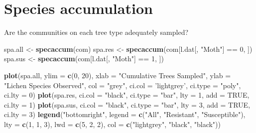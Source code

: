 \documentclass[]{article}
\newenvironment{Shaded}{\begin{snugshade}}{\end{snugshade}}
\newcommand{\KeywordTok}[1]{\textcolor[rgb]{0.13,0.29,0.53}{\textbf{{#1}}}}
\newcommand{\DataTypeTok}[1]{\textcolor[rgb]{0.13,0.29,0.53}{{#1}}}
\newcommand{\DecValTok}[1]{\textcolor[rgb]{0.00,0.00,0.81}{{#1}}}
\newcommand{\StringTok}[1]{\textcolor[rgb]{0.31,0.60,0.02}{{#1}}}
\newcommand{\OtherTok}[1]{\textcolor[rgb]{0.56,0.35,0.01}{{#1}}}
\newcommand{\NormalTok}[1]{{#1}}
\begin{document}
\section{Species accumulation}\label{species-accumulation}

Are the communities on each tree type adequately sampled?

\begin{Shaded}
\begin{Highlighting}[]
\NormalTok{spa.all <-}\StringTok{ }\KeywordTok{specaccum}\NormalTok{(com)}
\NormalTok{spa.res <-}\StringTok{ }\KeywordTok{specaccum}\NormalTok{(com[l.dat[, }\StringTok{"Moth"}\NormalTok{] ==}\StringTok{ }\DecValTok{0}\NormalTok{, ])}
\NormalTok{spa.sus <-}\StringTok{ }\KeywordTok{specaccum}\NormalTok{(com[l.dat[, }\StringTok{"Moth"}\NormalTok{] ==}\StringTok{ }\DecValTok{1}\NormalTok{, ])}

\KeywordTok{plot}\NormalTok{(spa.all,}
     \DataTypeTok{ylim =} \KeywordTok{c}\NormalTok{(}\DecValTok{0}\NormalTok{, }\DecValTok{20}\NormalTok{),}
     \DataTypeTok{xlab =} \StringTok{"Cumulative Trees Sampled"}\NormalTok{,}
     \DataTypeTok{ylab =} \StringTok{"Lichen Species Observed"}\NormalTok{, }
     \DataTypeTok{col =} \StringTok{"grey"}\NormalTok{, }\DataTypeTok{ci.col =} \StringTok{'lightgrey'}\NormalTok{, }\DataTypeTok{ci.type =} \StringTok{"poly"}\NormalTok{, }\DataTypeTok{ci.lty =} \DecValTok{0}\NormalTok{)}
\KeywordTok{plot}\NormalTok{(spa.res, }\DataTypeTok{ci.col =} \StringTok{"black"}\NormalTok{, }\DataTypeTok{ci.type =} \StringTok{"bar"}\NormalTok{, }\DataTypeTok{lty =} \DecValTok{1}\NormalTok{, }\DataTypeTok{add =} \OtherTok{TRUE}\NormalTok{, }\DataTypeTok{ci.lty =} \DecValTok{1}\NormalTok{)}
\KeywordTok{plot}\NormalTok{(spa.sus, }\DataTypeTok{ci.col =} \StringTok{"black"}\NormalTok{, }\DataTypeTok{ci.type =} \StringTok{"bar"}\NormalTok{, }\DataTypeTok{lty =} \DecValTok{3}\NormalTok{, }\DataTypeTok{add =} \OtherTok{TRUE}\NormalTok{, }\DataTypeTok{ci.lty =} \DecValTok{3}\NormalTok{)}
\KeywordTok{legend}\NormalTok{(}\StringTok{"bottomright"}\NormalTok{, }
       \DataTypeTok{legend =} \KeywordTok{c}\NormalTok{(}\StringTok{"All"}\NormalTok{, }\StringTok{"Resistant"}\NormalTok{, }\StringTok{"Susceptible"}\NormalTok{), }
       \DataTypeTok{lty =} \KeywordTok{c}\NormalTok{(}\DecValTok{1}\NormalTok{, }\DecValTok{1}\NormalTok{, }\DecValTok{3}\NormalTok{), }\DataTypeTok{lwd =} \KeywordTok{c}\NormalTok{(}\DecValTok{5}\NormalTok{, }\DecValTok{2}\NormalTok{, }\DecValTok{2}\NormalTok{), }\DataTypeTok{col =} \KeywordTok{c}\NormalTok{(}\StringTok{"lightgrey"}\NormalTok{, }\StringTok{"black"}\NormalTok{, }\StringTok{"black"}\NormalTok{))}
\end{Highlighting}
\end{Shaded}
\end{document}
